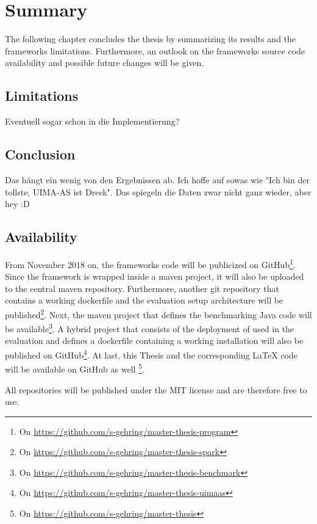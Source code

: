 \chapter{Summary}\label{ch:summary}
The following chapter concludes the thesis by summarizing its results and the frameworks limitations. Furthermore, an outlook on the frameworks source code availability and possible future changes will be given.

\section{Limitations}
Eventuell sogar schon in die Implementierung?

\section{Conclusion}

Das hängt ein wenig von den Ergebnissen ab. Ich hoffe auf sowas wie "Ich bin der tollste, UIMA-AS ist Dreck". Das spiegeln die Daten zwar nicht ganz wieder, aber hey :D


\section{Availability}
\label{sec:availability}
From November 2018 on, the frameworks code will be publicized on GitHub\footnote{On \url{https://github.com/s-gehring/master-thesis-program}}. Since the framework is wrapped inside a maven project, it will also be uploaded to the central maven repository. Furthermore, another git repository that contains a working \spark{} dockerfile and the evaluation setup architecture will be published\footnote{On \url{https://github.com/s-gehring/master-thesis-spark}}. Next, the maven project that defines the benchmarking Java code will be available\footnote{On \url{https://github.com/s-gehring/master-thesis-benchmark}}. A hybrid project that consists of the deployment of \uimaas{} used in the evaluation and defines a dockerfile containing a working \uimaas{} installation will also be published on GitHub\footnote{On \url{https://github.com/s-gehring/master-thesis-uimaas}}. At last, this Thesis and the corresponding \LaTeX{} code will be available on GitHub as well \footnote{On \url{https://github.com/s-gehring/master-thesis}}.

All repositories will be published under the MIT license and are therefore free to use.

